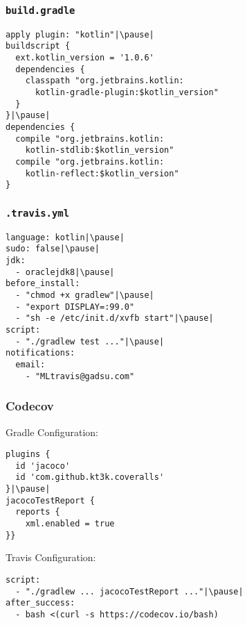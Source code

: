 


\begin{frame}[fragile] \frametitle{\texttt{build.gradle}}
\begin{lstlisting}
apply plugin: "kotlin"|\pause|
buildscript {
  ext.kotlin_version = '1.0.6'
  dependencies {
    classpath "org.jetbrains.kotlin:
      kotlin-gradle-plugin:$kotlin_version"
  }
}|\pause|
dependencies {
  compile "org.jetbrains.kotlin:
    kotlin-stdlib:$kotlin_version"
  compile "org.jetbrains.kotlin:
    kotlin-reflect:$kotlin_version"
}
\end{lstlisting}
\end{frame}


\begin{frame}[fragile] \frametitle{\texttt{.travis.yml}}
\begin{lstlisting}
language: kotlin|\pause|
sudo: false|\pause|
jdk:
  - oraclejdk8|\pause|
before_install:
  - "chmod +x gradlew"|\pause|
  - "export DISPLAY=:99.0"
  - "sh -e /etc/init.d/xvfb start"|\pause|
script:
  - "./gradlew test ..."|\pause|
notifications:
  email:
    - "MLtravis@gadsu.com"
\end{lstlisting}
\end{frame}


\begin{frame}[fragile] \frametitle{Codecov} 
Gradle Configuration:

\begin{lstlisting}
plugins {
  id 'jacoco'
  id 'com.github.kt3k.coveralls'
}|\pause|
jacocoTestReport {
  reports {
    xml.enabled = true
}}
\end{lstlisting}
\pause

Travis Configuration:

\begin{lstlisting}
script:
  - "./gradlew ... jacocoTestReport ..."|\pause|
after_success:
  - bash <(curl -s https://codecov.io/bash)
\end{lstlisting}


\end{frame}


